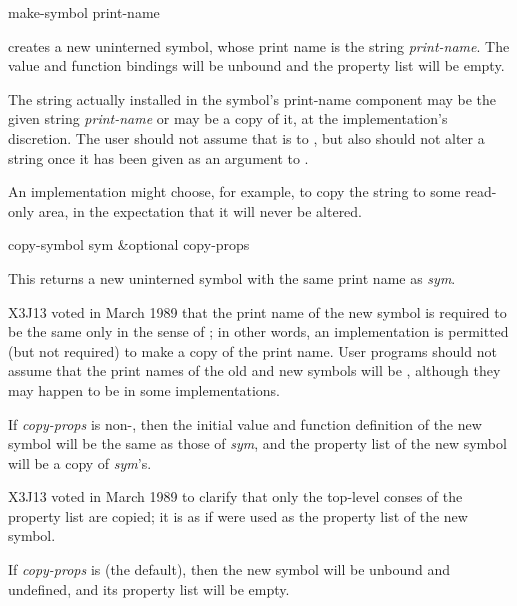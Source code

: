 \begin{defun}[Function]
make-symbol print-name

 creates a new uninterned symbol, whose
print name is the string {\it print-name}.  The value and function bindings will
be unbound and the property list will be empty.

The string actually installed in the symbol's print-name component
may be the given string {\it print-name} or may be a copy of it,
at the implementation's discretion.  The user should not assume
that  is  to , but also
should not alter a string once it has been given as an argument
to .

\beforenoterule
\begin{implementation}
An implementation might choose, for example,
to copy the string to some read-only area, in the expectation that
it will never be altered.
\end{implementation}
\afternoterule
\end{defun}

\begin{defun}[Function]
copy-symbol sym &optional copy-props

This returns a new uninterned symbol with the same print name
as {\it sym}.

\begin{newer}
X3J13 voted in March 1989 
that the print name of the new symbol is required to be
the same only in the sense of ; in other words,
an implementation is permitted (but not required)
to make a copy of the print name.
User programs should not assume that the print names of the old and new symbols
will be , although they may happen to be  in some implementations.
\end{newer}


If {\it copy-props} is non-{\nil}, then the initial
value and function definition of the new symbol will
be the same as those of {\it sym}, and the property list of
the new symbol will be a copy of {\it sym}'s.

\begin{newer}
X3J13 voted in March 1989 
to clarify that only the top-level conses of the
property list are copied; it is as if 
were used as the property list of the new symbol.
\end{newer}

If {\it copy-props}
is {\nil} (the default), then the new symbol will be unbound and undefined, and
its property list will be empty.
\end{defun}

